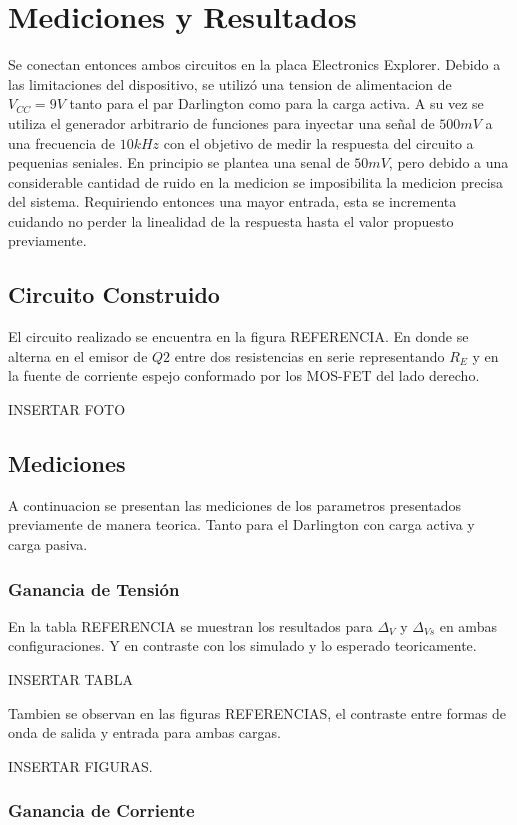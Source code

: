 \chapter{Mediciones y Resultados}
Se conectan entonces ambos circuitos en la placa Electronics Explorer. Debido a las limitaciones del dispositivo, se utilizó una tension de alimentacion de $V_{CC} = 9V$ tanto para el par Darlington como para la carga activa.
A su vez se utiliza el generador arbitrario de funciones para inyectar una señal de $500 mV$ a una frecuencia de $10kHz$ con el objetivo de medir la respuesta del circuito a pequenias seniales. En principio se plantea una senal de $50 mV$, pero debido a una considerable cantidad de ruido en la medicion se imposibilita la medicion precisa del sistema.
Requiriendo entonces una mayor entrada, esta se incrementa cuidando no perder la linealidad de la respuesta hasta el valor propuesto previamente.
\section{Circuito Construido}
El circuito realizado se encuentra en la figura REFERENCIA. En donde se alterna en el emisor de $Q2$ entre dos resistencias en serie representando $R_E$ y en la fuente de corriente espejo conformado por los MOS-FET del lado derecho.

INSERTAR FOTO


\section{Mediciones}
A continuacion se presentan las mediciones de los parametros presentados previamente de manera teorica. Tanto para el Darlington con carga activa y carga pasiva.

\subsection{Ganancia de Tensión}

En la tabla REFERENCIA se muestran los resultados para $\Delta_V$ y $\Delta_{Vs}$ en ambas configuraciones. Y en contraste con los simulado y lo esperado teoricamente.

INSERTAR TABLA 

Tambien se observan en las figuras REFERENCIAS, el contraste entre formas de onda de salida y entrada para ambas cargas.

INSERTAR FIGURAS.

\subsection{Ganancia de Corriente}
